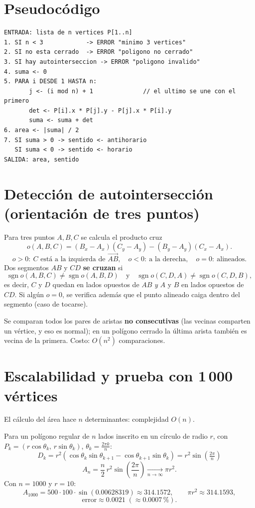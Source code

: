 ﻿\documentclass[11pt,a4paper]{article}
\begin{document}
\section{Pseudoc\'odigo}
\begin{verbatim}
ENTRADA: lista de n vertices P[1..n]
1. SI n < 3            -> ERROR "minimo 3 vertices"
2. SI no esta cerrado  -> ERROR "poligono no cerrado"
3. SI hay autointerseccion -> ERROR "poligono invalido"
4. suma <- 0
5. PARA i DESDE 1 HASTA n:
       j <- (i mod n) + 1              // el ultimo se une con el primero
       det <- P[i].x * P[j].y - P[j].x * P[i].y
       suma <- suma + det
6. area <- |suma| / 2
7. SI suma > 0 -> sentido <- antihorario
   SI suma < 0 -> sentido <- horario
SALIDA: area, sentido
\end{verbatim}

\section{Detecci\'on de autointersecci\'on (orientaci\'on de tres puntos)}
Para tres puntos $A,B,C$ se calcula el producto cruz
\[
o(A,B,C)=(B_x-A_x)(C_y-A_y)-(B_y-A_y)(C_x-A_x).
\]
\[
o>0:\ \text{$C$ est\'a a la izquierda de }\overrightarrow{AB},\quad
o<0:\ \text{a la derecha},\quad
o=0:\ \text{alineados}.
\]
Dos segmentos $AB$ y $CD$ \textbf{se cruzan} si
\[
\operatorname{sgn} o(A,B,C)\neq\operatorname{sgn} o(A,B,D)
\quad\text{y}\quad
\operatorname{sgn} o(C,D,A)\neq\operatorname{sgn} o(C,D,B),
\]
es decir, $C$ y $D$ quedan en lados opuestos de $AB$ \emph{y} $A$ y $B$ en lados
opuestos de $CD$. Si alg\'un $o=0$, se verifica adem\'as que el punto alineado caiga
dentro del segmento (caso de tocarse).

Se comparan todos los pares de aristas \textbf{no consecutivas} (las vecinas comparten
un v\'ertice, y eso es normal); en un pol\'igono cerrado la \'ultima arista tambi\'en
es vecina de la primera. Costo: $O(n^2)$ comparaciones.

\section{Escalabilidad y prueba con 1\,000 v\'ertices}
El c\'alculo del \'area hace $n$ determinantes: complejidad $O(n)$.

Para un pol\'igono regular de $n$ lados inscrito en un c\'irculo de radio $r$,
con $P_k=(r\cos\theta_k,\,r\sin\theta_k)$, $\theta_k=\tfrac{2\pi k}{n}$:
\[
D_k=r^2\left(\cos\theta_k\sin\theta_{k+1}-\cos\theta_{k+1}\sin\theta_k\right)
=r^2\sin\!\left(\tfrac{2\pi}{n}\right)
\]
\[
A_n=\frac{n}{2}\,r^2\sin\!\left(\frac{2\pi}{n}\right)\xrightarrow[n\to\infty]{}\pi r^2 .
\]
Con $n=1000$ y $r=10$:
\[
A_{1000}=500\cdot100\cdot\sin(0.00628319)\approx 314.1572,\qquad
\pi r^2\approx 314.1593,
\]
\[
\text{error}\approx 0.0021 \;(\approx 0.0007\,\%).
\]
\end{document}
